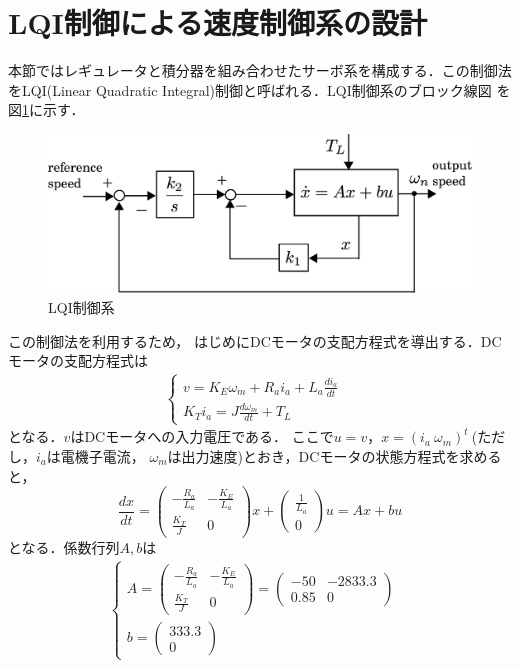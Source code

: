 \documentclass[a4paper,12pt]{jarticle}
\begin{document}
\section{LQI制御による速度制御系の設計}
本節ではレギュレータと積分器を組み合わせたサーボ系を構成する．この制御法
をLQI(Linear Quadratic Integral)制御と呼ばれる．LQI制御系のブロック線図
を図\ref{fig:LQI_model}に示す．
%
\begin{figure}[htbp]
 \begin{center}
  \includegraphics[width = 150mm]{fig/LQI_model.eps}
 \end{center}
 \caption{LQI制御系}
 \label{fig:LQI_model}
\end{figure}
%
この制御法を利用するため，
はじめにDCモータの支配方程式を導出する．DCモータの支配方程式は
%
\begin{eqnarray}
 \begin{cases}
  v = K_{E}\omega_m + R_{a}i_{a} + L_{a} \frac{di_a}{dt} & \\
  K_{T}i_a = J \frac{d\omega_m}{dt} + T_{L}
 \end{cases}
\end{eqnarray}
%
となる．$v$はDCモータへの入力電圧である．
ここで$u=v$，$x=(i_a  \ \omega_m)^t \ $(ただし，$i_a$は電機子電流，
$\omega_m$は出力速度)とおき，DCモータの状態方程式を求めると，
\begin{equation}
 \frac{dx}{dt} =
  \begin{pmatrix}
   - \frac{R_a}{L_a} & -\frac{K_E}{L_a} \\
   \frac{K_T}{J} & 0
  \end{pmatrix}
  x +
\begin{pmatrix}
 \frac{1}{L_a} \\
 0
\end{pmatrix}
u = Ax + bu
\end{equation}
となる．係数行列$A,b$は
%
\begin{eqnarray}
 \begin{cases}
A=
  \begin{pmatrix}
   - \frac{R_a}{L_a} & -\frac{K_E}{L_a} \\
   \frac{K_T}{J} & 0
  \end{pmatrix}
  =
  \begin{pmatrix}
   -50  & -2833.3 \\
   0.85 & 0
  \end{pmatrix}
  & \\
  b =
  \begin{pmatrix}
   333.3 \\
   0
  \end{pmatrix}
 \end{cases}
\end{eqnarray}
\end{document}
